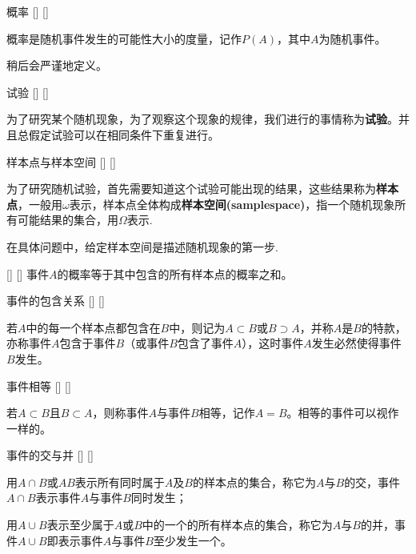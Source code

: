 \documentclass[UTF8]{ctexart}
\begin{document}
        \begin{dfn}
            []
            {概率}
            []
            []


            概率是随机事件发生的可能性大小的度量，记作$P(A)$，其中$A$为随机事件。
        \end{dfn}

        稍后会严谨地定义。

        \begin{dfn}
            []
            {试验}
            []
            []


            为了研究某个随机现象，为了观察这个现象的规律，我们进行的事情称为\textbf{试验}。并且总假定试验可以在相同条件下重复进行。
        \end{dfn}

        \begin{dfn}
            []
            {样本点与样本空间}
            []
            []


            为了研究随机试验，首先需要知道这个试验可能出现的结果，这些结果称为\textbf{样本点}，一般用$\omega$表示，样本点全体构成\textbf{样本空间(samplespace)}，指一个随机现象所有可能结果的集合，用$\Omega$表示.
        \end{dfn}

        在具体问题中，给定样本空间是描述随机现象的第一步.

        \begin{ppt}
            []
            {}
            []
            []
            事件$A$的概率等于其中包含的所有样本点的概率之和。
        \end{ppt}

        \begin{dfn}
            []
            {事件的包含关系}
            []
            []


            若$A$中的每一个样本点都包含在$B$中，则记为$A\subset B$或$B\supset  A$，并称$A$是$B$的特款，亦称事件$A$包含于事件$B$（或事件$B$包含了事件$A$），这时事件$A$发生必然使得事件$B$发生。
        \end{dfn}

        \begin{dfn}
            []
            {事件相等}
            []
            []


            若$A\subset B$且$B\subset A$，则称事件$A$与事件$B$相等，记作$A=B$。相等的事件可以视作一样的。
        \end{dfn}

        \begin{dfn}
            []
            {事件的交与并}
            []
            []


            用$A\cap B$或$AB$表示所有同时属于$A$及$B$的样本点的集合，称它为$A$与$B$的交，事件$A\cap B$表示事件$A$与事件$B$同时发生；
    
            用$A\cup  B$表示至少属于$A$或$B$中的一个的所有样本点的集合，称它为$A$与$B$的并，事件$A\cup B$即表示事件$A$与事件$B$至少发生一个。
        \end{dfn}
\end{document}

